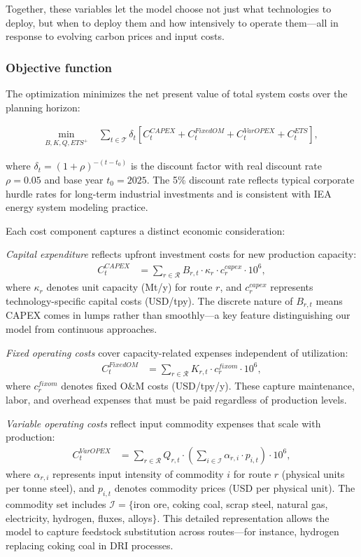 \documentclass[preprint,1p,authoryear]{elsarticle}
\begin{document}
Together, these variables let the model choose not just what technologies to deploy, but when to deploy them and how intensively to operate them—all in response to evolving carbon prices and input costs.

\subsubsection{Objective function}

The optimization minimizes the net present value of total system costs over the planning horizon:

\begin{align}
\min_{B,K,Q,ETS^+} \; & \sum_{t \in \mathcal{T}} \delta_t \left[ C^{CAPEX}_t + C^{FixedOM}_t + C^{VarOPEX}_t + C^{ETS}_t \right],
\end{align}

where $\delta_t = (1+\rho)^{-(t-t_0)}$ is the discount factor with real discount rate $\rho = 0.05$ and base year $t_0 = 2025$. The 5\% discount rate reflects typical corporate hurdle rates for long-term industrial investments and is consistent with IEA energy system modeling practice.

Each cost component captures a distinct economic consideration:

\textit{Capital expenditure} reflects upfront investment costs for new production capacity:
\begin{align}
C^{CAPEX}_t &= \sum_{r \in \mathcal{R}} B_{r,t} \cdot \kappa_r \cdot c^{capex}_r \cdot 10^6, \label{eq:capex}
\end{align}
where $\kappa_r$ denotes unit capacity (Mt/y) for route $r$, and $c^{capex}_r$ represents technology-specific capital costs (USD/tpy). The discrete nature of $B_{r,t}$ means CAPEX comes in lumps rather than smoothly—a key feature distinguishing our model from continuous approaches.

\textit{Fixed operating costs} cover capacity-related expenses independent of utilization:
\begin{align}
C^{FixedOM}_t &= \sum_{r \in \mathcal{R}} K_{r,t} \cdot c^{fixom}_r \cdot 10^6, \label{eq:fixom}
\end{align}
where $c^{fixom}_r$ denotes fixed O\&M costs (USD/tpy/y). These capture maintenance, labor, and overhead expenses that must be paid regardless of production levels.

\textit{Variable operating costs} reflect input commodity expenses that scale with production:
\begin{align}
C^{VarOPEX}_t &= \sum_{r \in \mathcal{R}} Q_{r,t} \cdot \left( \sum_{i \in \mathcal{I}} \alpha_{r,i} \cdot p_{i,t} \right) \cdot 10^6, \label{eq:varopex}
\end{align}
where $\alpha_{r,i}$ represents input intensity of commodity $i$ for route $r$ (physical units per tonne steel), and $p_{i,t}$ denotes commodity prices (USD per physical unit). The commodity set includes $\mathcal{I} = \{$iron ore, coking coal, scrap steel, natural gas, electricity, hydrogen, fluxes, alloys$\}$. This detailed representation allows the model to capture feedstock substitution across routes—for instance, hydrogen replacing coking coal in DRI processes.
\end{document}
